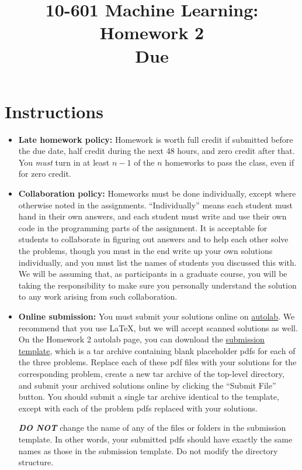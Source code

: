 \documentclass{article}
\title{
  10-601 Machine Learning: Homework 2\\
  \vspace{0.2cm}
  \large{
    Due \duedate{}
  }
}
\date{}
\author{}
\begin{document}
\maketitle

\section*{Instructions}
\begin{itemize}
\item {\bf Late homework policy:} Homework is worth full credit if
  submitted before the due date, half credit during the next 48 hours,
  and zero credit after that.  You {\em must} turn in at least $n-1$
  of the $n$ homeworks to pass the class, even if for zero credit.
\item {\bf Collaboration policy:} Homeworks must be done individually,
  except where otherwise noted in the assignments. ``Individually''
  means each student must hand in their own answers, and each student
  must write and use their own code in the programming parts of the
  assignment. It is acceptable for students to collaborate in figuring
  out answers and to help each other solve the problems, though you
  must in the end write up your own solutions individually, and you
  must list the names of students you discussed this with.  We will be
  assuming that, as participants in a graduate course, you will be
  taking the responsibility to make sure you personally understand the
  solution to any work arising from such collaboration.
\item {\bf Online submission:} You must submit your solutions online
  on
  \href{https://autolab.cs.cmu.edu/courses/27/assessments/97}{autolab}.
  We recommend that you use \LaTeX{}, but we will accept scanned
  solutions as well. On the Homework 2 autolab page, you can download
  the
  \href{https://autolab.cs.cmu.edu/courses/27/assessments/97/attachments}{submission
    template}, which is a tar archive containing blank placeholder
  pdfs for each of the three problems. Replace each of these pdf files
  with your solutions for the corresponding problem, create a new tar
  archive of the top-level directory, and submit your archived
  solutions online by clicking the ``Submit File'' button. You should
  submit a single tar archive identical to the template, except with
  each of the problem pdfs replaced with your solutions.

  \textbf{\emph{DO NOT}} change the name of any of the files or
  folders in the submission template. In other words, your submitted
  pdfs should have exactly the same names as those in the submission
  template. Do not modify the directory structure.

\end{itemize}
\end{document}
